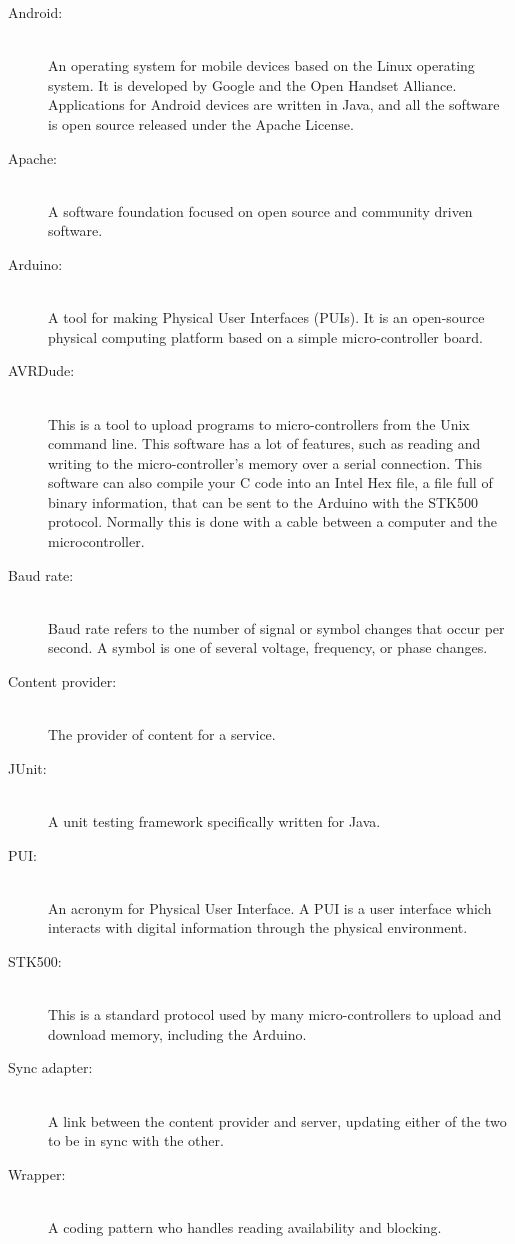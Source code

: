 \begin{description}
	\item[Android:]\hfill \\
		An operating system for mobile devices based on the Linux operating system. It is developed by Google and the Open Handset Alliance. Applications for Android devices are written in Java, and all the software is open source released under the Apache License.
	\item[Apache:] \hfill \\
		A software foundation focused on open source and community driven software.
	\item[Arduino:]\hfill \\
		A tool for making Physical User Interfaces (PUIs). It is an open-source physical computing platform based on a simple micro-controller board.
	\item[AVRDude:]\hfill \\
		This is a tool to upload programs to micro-controllers from the Unix command line. This software has a lot of features, such as reading and writing to the micro-controller's memory over a serial connection. This software can also compile your C code into an Intel Hex file, a file full of binary information, that can be sent to the Arduino with the STK500 protocol. Normally this is done with a cable between a computer and the microcontroller.
	\item[Baud rate:]\hfill \\
		Baud rate refers to the number of signal or symbol changes that occur per second. A symbol is one of several voltage, frequency, or phase changes. \cite{baudrate}
	\item[Content provider:]\hfill \\
		The provider of content for a service. 
	\item[JUnit:]\hfill \\
		A unit testing framework specifically written for Java.
	\item[PUI:]\hfill \\
		An acronym for Physical User Interface. A PUI is a user interface which interacts with digital information through the physical environment.
	\item[STK500:]\hfill \\
		This is a standard protocol used by many micro-controllers to upload and download memory, including the Arduino.
	\item[Sync adapter:]\hfill \\
		A link between the content provider and server, updating either of the two to be in sync with the other.
	\item[Wrapper:]\hfill \\
		A coding pattern who handles reading availability and blocking.
\end{description}


